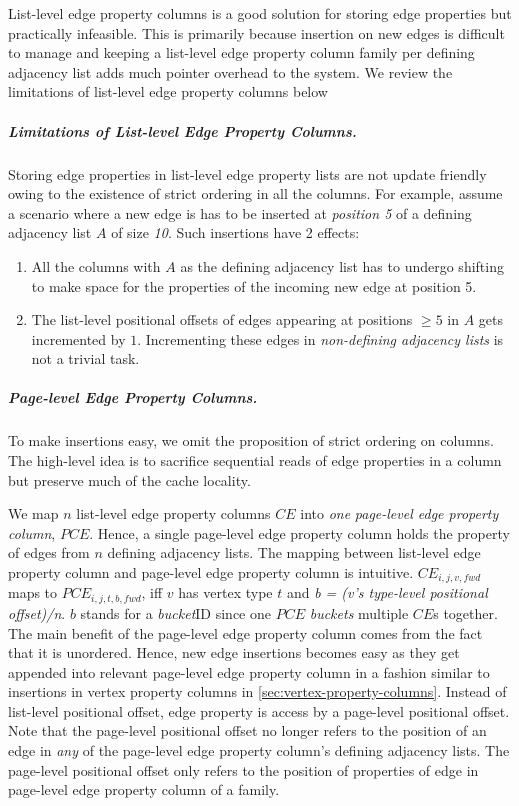 List-level edge property columns is a good solution for storing edge properties but practically infeasible. This is primarily because insertion on new edges is difficult to manage and keeping a list-level edge property column family per defining adjacency list adds much pointer overhead to the system. We review the limitations of list-level edge property columns below


\vspace{-12pt}
\subparagraph{Limitations of List-level Edge Property Columns.}
Storing edge properties in list-level edge property lists are not update friendly owing to the existence of strict ordering in all the columns. For example, assume a scenario where a new edge is has to be inserted at \emph{position 5} of a defining adjacency list $A$ of size \emph{10}. Such insertions have 2 effects: 
\begin{enumerate}
	\item All the columns with $A$ as the defining adjacency list has to undergo shifting to make space for the properties of the incoming new edge at position 5.
	\item The list-level positional offsets of edges appearing at positions $\geq 5$ in $A$ gets incremented by $1$. Incrementing these edges in \emph{non-defining adjacency lists} is not a trivial task.  
\end{enumerate}

\vspace{-16pt}
\subparagraph{Page-level Edge Property Columns.}
To make insertions easy, we omit the proposition of strict ordering on columns. The high-level idea is to sacrifice sequential reads of edge properties in a column but preserve much of the cache locality.

We map $n$ list-level edge property columns $CE$ into \emph{one} \emph{page-level edge property column}, $PCE$. Hence, a single page-level edge property column holds the property of edges from $n$ defining adjacency lists. The mapping between list-level edge property column and page-level edge property column is intuitive. $CE_{i,j,v,fwd}$ maps to $PCE_{i,j,t,b,fwd}$, iff $v$ has vertex type $t$ and \emph{b = (v's type-level positional offset)/n}. $b$ stands for a \emph{bucket}ID since  one $PCE$ \emph{buckets} multiple $CE$s together. The main benefit of the page-level edge property column comes from the fact that it is unordered. Hence, new edge insertions becomes easy as they get appended into relevant page-level edge property column in a fashion similar to insertions in vertex property columns in \ref{sec:vertex-property-columns}. Instead of list-level positional offset, edge property is access by a page-level positional offset. Note that the page-level positional offset no longer refers to the position of an edge in \emph{any} of the page-level edge property column's defining adjacency lists. The page-level positional offset only refers to the position of properties of edge in page-level edge property column of a family. 


